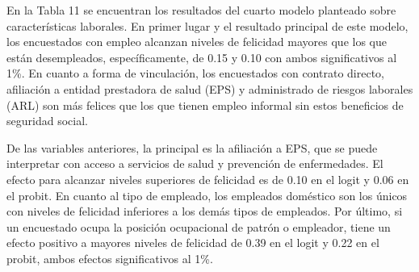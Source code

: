 \documentclass[12pt,spanish]{article}
\begin{document}
En la Tabla 11 se encuentran los resultados del cuarto modelo planteado sobre características laborales. En primer lugar y el resultado principal de este modelo, los encuestados con empleo alcanzan niveles de felicidad mayores que los que están desempleados, específicamente, de 0.15 y 0.10 con ambos significativos al 1\%. En cuanto a forma de vinculación, los encuestados con contrato directo, afiliación a entidad prestadora de salud (EPS) y administrado de riesgos laborales (ARL) son más felices que los que tienen empleo informal sin estos beneficios de seguridad social. 

De las variables anteriores, la principal es la afiliación a EPS, que se puede interpretar con acceso a servicios de salud y prevención de enfermedades. El efecto para alcanzar niveles superiores de felicidad es de 0.10 en el logit y 0.06 en el probit. En cuanto al tipo de empleado, los empleados doméstico son los únicos con niveles de felicidad inferiores a los demás tipos de empleados. Por último, si un encuestado ocupa la posición ocupacional de patrón o empleador, tiene un efecto positivo a mayores niveles de felicidad de 0.39 en el logit y 0.22 en el probit, ambos efectos significativos al 1\%. 
\end{document}
